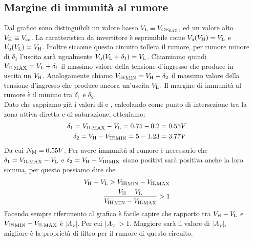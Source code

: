 \documentclass[../template]{subfiles}
\begin{document}
\subsection{Margine di immunità al rumore}
\begin{figure}[h]
    \centering
\end{figure}
\noindent
Dal grafico sono distinguibili un valore basso $V_{\text{L}} \equiv V_{\text{CE}_{\text{SAT}}}$, ed un valore alto $V_{\text{H}} \equiv V_{\text{cc}}$.
La caratteristica da invertitore è esprimibile come $V_{\text{u}}(V_{\text{H}}) = V_{\text{L}}$ e $V_{\text{u}}(V_{\text{L}}) = V_{\text{H}}$.
Inoltre siccome questo circuito tollera il rumore, per rumore minore di $\delta_1$ l'uscita \vu sarà ugualmente $V_{\text{u}}(V_{\text{L}} + \delta_1) = V_{\text{L}}$.
Chiamiamo quindi ${V_{\text{IL}}}_\text{MAX} = V_{\text{L}} + \delta_1$ il massimo valore della tensione d'ingresso che produce in uscita un $V_{\text{H}}$.
Analogamente chiamo ${V_{\text{IH}}}_\text{MIN} = V_{\text{H}} - \delta_2$ il massimo valore della tensione d'ingresso che produce ancora un'uscita $V_{\text{L}}$.
Il margine di immunità al rumore \nm è il minimo tra $\delta_1$ e $\delta_2$.
\\
Dato che sappiamo già i valori di  e , calcolando \vihmin come punto di intersezione tra la zona attiva diretta e di saturazione,
otteniamo:
\begin{align*}
    \delta_1 = {V_{\text{IL}}}_\text{MAX} - V_{\text{L}} = 0.75 - 0.2 = 0.55 V\\
    \delta_2 = V_{\text{H}} - {V_{\text{IH}}}_\text{MIN} = 5 - 1.23 = 3.77V
\end{align*}
Da cui ${N}_\text{M} = 0.55 V$. Per avere immunità al rumore è necessario che $\delta_1 = {V_{\text{IL}}}_\text{MAX} - V_{\text{L}}$ e $\delta_2 = V_{\text{H}} - {V_{\text{IH}}}_\text{MIN}$ siano positivi
sarà positiva anche la loro somma, per questo possiamo dire che
\begin{align*}
    V_{\text{H}} - V_{\text{L}} > {V_{\text{IH}}}_\text{MIN} - {V_{\text{IL}}}_\text{MAX}\\
    \frac{V_{\text{H}} - V_{\text{L}}}{ {V_{\text{IH}}}_\text{MIN} - {V_{\text{IL}}}_\text{MAX}} > 1
\end{align*}
Facendo sempre riferimento al grafico è facile capire che rapporto tra $V_{\text{H}} - V_{\text{L}}$ e ${V_{\text{IH}}}_\text{MIN} - {V_{\text{IL}}}_\text{MAX}$ è $|A_V|$.
Per cui $|A_V| > 1$. Maggiore sarà il valore di $|A_V|$, migliore è la proprietà di filtro per il rumore di questo
circuito.
\end{document}
